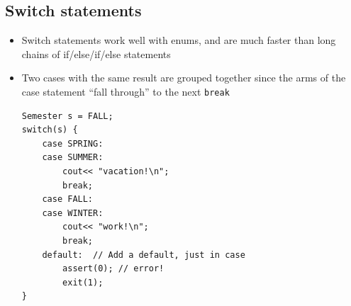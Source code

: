 \subsection{Switch statements}
\begin{itemize}
	\item Switch statements work well with enums, and are much faster than long chains of if/else/if/else statements
	\item Two cases with the same result are grouped together since the arms of the case statement ``fall through'' to the next \lstinline[style=C++]{break}
\begin{lstlisting}[style=C++]
Semester s = FALL;
switch(s) {
	case SPRING:
	case SUMMER:
		cout<< "vacation!\n";
		break;
	case FALL:
	case WINTER:
		cout<< "work!\n";
		break;
	default:  // Add a default, just in case
		assert(0); // error!
		exit(1);
}
\end{lstlisting}
\end{itemize}

